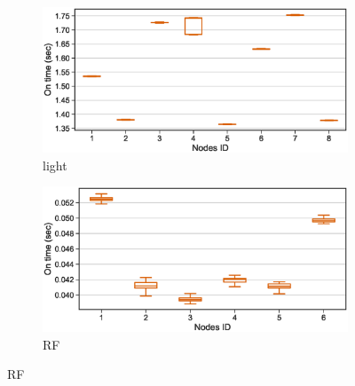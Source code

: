 \begin{figure}[t]
		\begin{subfigure}{.49\columnwidth}
			\centering
			\includegraphics[width=\textwidth]{figures/light_on_time}
			\caption{light}
		\end{subfigure} \hfill
		\begin{subfigure}{.49\columnwidth}
			\centering
			\includegraphics[width=\textwidth]{figures/rf_on_time}
				\caption{RF}
		\end{subfigure}\hfill
		

\end{figure}
